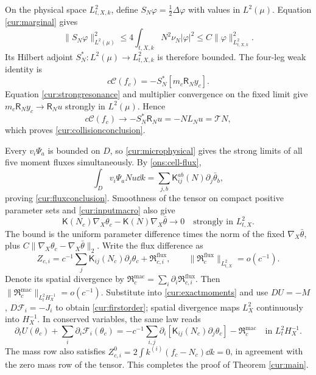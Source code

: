 On the physical space $L^2_{t,X,k}$, define
$S_N\varphi=\frac12\Delta\varphi$ with values in $L^2(\mu)$.
Equation \eqref{cur:marginal} gives
\begin{equation}\label{cur:returnbound}
 \|S_N\varphi\|_{L^2(\mu)}^2
       \le4\int_{t,X,k}N^2\nu_N|\varphi|^2
       \le C\|\varphi\|_{L^2_{t,X,k}}^2.
\end{equation}
Its Hilbert adjoint $S_N^*:L^2(\mu)\to L^2_{t,X,k}$ is therefore bounded.
The four-leg weak identity is
\begin{equation}\label{cur:returnidentity}
 c\mathcal C(f_c)=-S_N^*[m_c\mathsf R_Ny_c].
\end{equation}
Equation \eqref{cur:strongresonance} and multiplier convergence on the
fixed limit give $m_c\mathsf R_Ny_c\to\mathsf R_Nu$ strongly in $L^2(\mu)$.
Hence
\[
 c\mathcal C(f_c)\longrightarrow-S_N^*\mathsf R_Nu
                    =-NL_Nu=\mathcal TN,
\]
which proves \eqref{cur:collisionconclusion}.

Every $v_i\Psi_a$ is bounded on $D$, so
\eqref{cur:microphysical} gives the strong limits of all five moment
fluxes simultaneously. By \eqref{ons:cell-flux},
\[
 \int_Dv_i\Psi_aNu\dd k
       =\sum_{j,b}\mathsf K_{ij}^{ab}(N)\partial_j\bar\theta_b,
\]
proving \eqref{cur:fluxconclusion}.
Smoothness of the tensor on compact positive parameter sets and
\eqref{cur:inputmacro} also give
\begin{equation}\label{cur:actualparameterflux}
 \mathsf K(N_c)\nabla_X\theta_c
       -\mathsf K(N)\nabla_X\bar\theta\longrightarrow0
                       \quad\text{strongly in }L^2_{t,X}.
\end{equation}
The bound is the uniform parameter difference times the norm of the
fixed $\nabla_X\bar\theta$, plus
$C\|\nabla_X\theta_c-\nabla_X\bar\theta\|_2$.
Write the flux difference as
\[
 Z_{c,i}=c^{-1}\sum_j\mathsf K_{ij}(N_c)\partial_j\theta_c
                  +\mathfrak R_{c,i}^{\mathrm{flux}},\qquad
 \|\mathfrak R_c^{\mathrm{flux}}\|_{L^2_{t,X}}=o(c^{-1}).
\]
Denote its spatial divergence by
$\mathfrak R_c^{\mathrm{mac}}=\sum_i\partial_i\mathfrak R_{c,i}^{\mathrm{flux}}$.
Then $\|\mathfrak R_c^{\mathrm{mac}}\|_{L^2_tH^{-1}_X}=o(c^{-1})$.
Substitute into \eqref{cur:exactmoments} and use
$DU=-M$, $D\mathcal F_i=-J_i$ to obtain \eqref{cur:firstorder};
spatial divergence maps $L^2_X$ continuously into $H^{-1}_X$.
In conserved variables, the same law reads
\[
 \partial_tU(\theta_c)+\sum_i\partial_i\mathcal F_i(\theta_c)
 =-c^{-1}\sum_{i,j}\partial_i
      [\mathsf K_{ij}(N_c)\partial_j\theta_c]
      -\mathfrak R_c^{\mathrm{mac}}\quad\text{in }L^2_tH^{-1}_X.
\]
The mass row also satisfies
$Z_{c,i}^0=2\int k^{(i)}(f_c-N_c)\dd k=0$, in agreement with the zero
mass row of the tensor. This completes the proof of
Theorem \ref{cur:main}.

